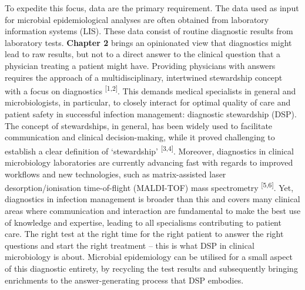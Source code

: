 \documentclass[
]{book}
\begin{document}
To expedite this focus, data are the primary requirement. The data used as input for microbial epidemiological analyses are often obtained from laboratory information systems (LIS). These data consist of routine diagnostic results from laboratory tests. \textbf{Chapter 2} brings an opinionated view that diagnostics might lead to raw results, but not to a direct answer to the clinical question that a physician treating a patient might have. Providing physicians with answers requires the approach of a multidisciplinary, intertwined stewardship concept with a focus on diagnostics \textsuperscript{{[}1,2{]}}. This demands medical specialists in general and microbiologists, in particular, to closely interact for optimal quality of care and patient safety in successful infection management: diagnostic stewardship (DSP). The concept of stewardships, in general, has been widely used to facilitate communication and clinical decision-making, while it proved challenging to establish a clear definition of `stewardship' \textsuperscript{{[}3,4{]}}. Moreover, diagnostics in clinical microbiology laboratories are currently advancing fast with regards to improved workflows and new technologies, such as matrix-assisted laser desorption/ionisation time-of-flight (MALDI-TOF) mass spectrometry \textsuperscript{{[}5,6{]}}. Yet, diagnostics in infection management is broader than this and covers many clinical areas where communication and interaction are fundamental to make the best use of knowledge and expertise, leading to all specialisms contributing to patient care. The right test at the right time for the right patient to answer the right questions and start the right treatment -- this is what DSP in clinical microbiology is about. Microbial epidemiology can be utilised for a small aspect of this diagnostic entirety, by recycling the test results and subsequently bringing enrichments to the answer-generating process that DSP embodies.
\end{document}

